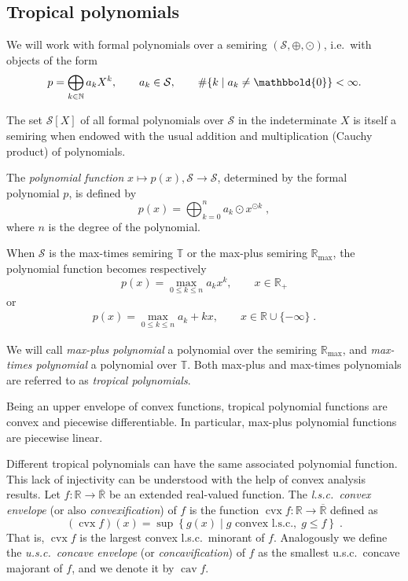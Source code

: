 \documentclass[a4paper]{amsart}
\theoremstyle{definition}
\theoremstyle{plain}
\theoremstyle{remark}
\begin{document}
\subsection{Tropical polynomials}
We will work with formal polynomials over a semiring $( {\mathcal{S}}, \oplus, \odot )$,
i.e.\ with objects of the form
\[
    p = \bigoplus_{k \in {\mathbb{N}}} a_k X^k, \qquad
a_k \in {\mathcal{S}} ,
\qquad 
{\# {\left\{ k \mid a_k \neq {\mathbbold{0}} \right\}}} < \infty.
\]

The set ${\mathcal{S}}[X]$ of all formal polynomials over ${\mathcal{S}}$ in the indeterminate $X$ is itself a semiring when endowed with the usual addition and multiplication (Cauchy product) of polynomials.

The {\em polynomial function}  $x\mapsto p(x), {\mathcal{S}} \to {\mathcal{S}}$, determined by the formal polynomial $p$, is defined by
\[
 p(x) = \bigoplus_{k=0}^n a_k \odot x^{\odot k} \; ,
\]
where $n$ is the degree of the polynomial.

When ${\mathcal{S}}$ is the max-times semiring ${{\mathbb{T}}}$ or the max-plus semiring ${{\mathbb{R}_{\max}}}$, the polynomial function becomes respectively
\[
p(x) = \max_{0 {\leqslant} k {\leqslant} n} a_k x^k, \qquad x \in {\mathbb{R}}_+
\]
or
\begin{align}
p(x) = \max_{0 {\leqslant} k {\leqslant} n} a_k + kx, \qquad x \in {\mathbb{R}} \cup \{-\infty\} \;  .
\label{e-def-evalp}
\end{align}

We will call \emph{max-plus polynomial} a polynomial over the semiring ${{\mathbb{R}_{\max}}}$,
and \emph{max-times polynomial} a polynomial over ${{\mathbb{T}}}$.
Both max-plus and max-times polynomials are referred to as \emph{tropical polynomials}.

Being an upper envelope of convex functions, tropical polynomial functions are convex and piecewise differentiable.
In particular, max-plus polynomial functions are piecewise linear.

\fi

Different tropical polynomials can have the same associated polynomial function.
This lack of injectivity can be understood with the help of 
convex analysis results.
Let $f \colon {\mathbb{R}} \to \overline{\mathbb{R}}$ be an extended real-valued function.
The \emph{l.s.c.\ convex envelope} (or also \emph{convexification}) of $f$ is the function $\operatorname{cvx} f \colon {\mathbb{R}} \to \overline{\mathbb{R}}$ defined as
\[
 (\operatorname{cvx} f) (x) = \sup \left\{ g(x) \mid g \mbox{ convex l.s.c.}, \; g {\leqslant} f \right\} \;  .
\]
That is, $\operatorname{cvx} f$ is the largest convex l.s.c.\ minorant of $f$.
Analogously we define the \emph{u.s.c.\ concave envelope} (or \emph{concavification}) of $f$
as the smallest u.s.c.\ concave majorant of $f$, and we denote it by $\operatorname{cav} f$.
\end{document}
